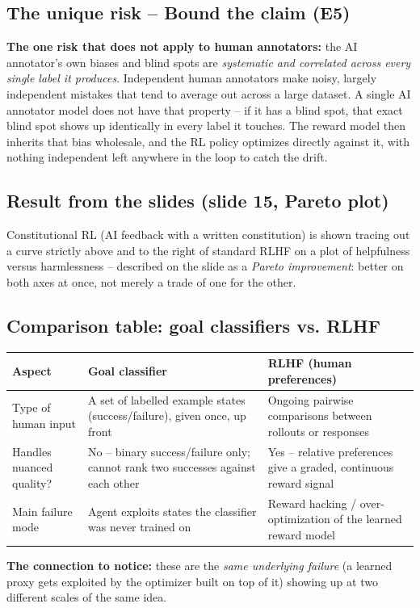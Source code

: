 \documentclass[11pt]{article}
\begin{document}
\subsection{The unique risk -- Bound the claim (E5)}
\textbf{The one risk that does not apply to human annotators:} the AI
annotator's own biases and blind spots are \emph{systematic and correlated
across every single label it produces}. Independent human annotators make noisy,
largely independent mistakes that tend to average out across a large dataset. A
single AI annotator model does not have that property -- if it has a blind spot,
that exact blind spot shows up identically in every label it touches. The reward
model then inherits that bias wholesale, and the RL policy optimizes directly
against it, with nothing independent left anywhere in the loop to catch the
drift.

\subsection{Result from the slides (slide 15, Pareto plot)}
Constitutional RL (AI feedback with a written constitution) is shown tracing out
a curve strictly above and to the right of standard RLHF on a plot of
helpfulness versus harmlessness -- described on the slide as a \emph{Pareto
improvement}: better on both axes at once, not merely a trade of one for the
other.

\subsection{Comparison table: goal classifiers vs. RLHF}
\begin{center}
\begin{longtable}{|>{\raggedright\arraybackslash}p{3.4cm}|>{\raggedright\arraybackslash}p{5.0cm}|>{\raggedright\arraybackslash}p{5.0cm}|}
\hline
\textbf{Aspect} & \textbf{Goal classifier} & \textbf{RLHF (human preferences)} \\
\hline
Type of human input & A set of labelled example states (success/failure), given
once, up front & Ongoing pairwise comparisons between rollouts or responses \\
\hline
Handles nuanced quality? & No -- binary success/failure only; cannot rank two
successes against each other & Yes -- relative preferences give a graded,
continuous reward signal \\
\hline
Main failure mode & Agent exploits states the classifier was never trained on &
Reward hacking / over-optimization of the learned reward model \\
\hline
\end{longtable}
\end{center}
\textbf{The connection to notice:} these are the \emph{same underlying failure}
(a learned proxy gets exploited by the optimizer built on top of it) showing up
at two different scales of the same idea.
\end{document}
